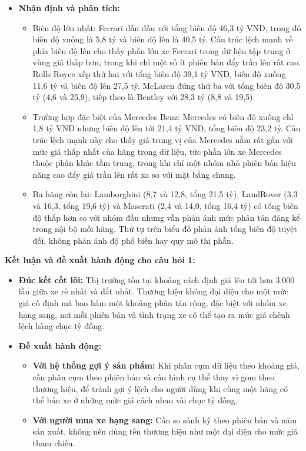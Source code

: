 \begin{itemize}
    \item \textbf{Nhận định và phân tích:}
    \begin{itemize}
        \item Biên độ lớn nhất: Ferrari dẫn đầu với tổng biên độ 46,3 tỷ VND, trong đó biên độ xuống là 5,8 tỷ và biên độ lên là 40,5 tỷ. Cấu trúc lệch mạnh về phía biên độ lên cho thấy phần lớn xe Ferrari trong dữ liệu tập trung ở vùng giá thấp hơn, trong khi chỉ một số ít phiên bản đẩy trần lên rất cao. Rolls Royce xếp thứ hai với tổng biên độ 39,1 tỷ VND, biên độ xuống 11,6 tỷ và biên độ lên 27,5 tỷ. McLaren đứng thứ ba với tổng biên độ 30,5 tỷ (4,6 và 25,9), tiếp theo là Bentley với 28,3 tỷ (8,8 và 19,5).
        \item Trường hợp đặc biệt của Mercedes Benz: Mercedes có biên độ xuống chỉ 1,8 tỷ VND nhưng biên độ lên tới 21,4 tỷ VND, tổng biên độ 23,2 tỷ. Cấu trúc lệch mạnh này cho thấy giá trung vị của Mercedes nằm rất gần với mức giá thấp nhất của hãng trong dữ liệu, tức phần lớn xe Mercedes thuộc phân khúc tầm trung, trong khi chỉ một nhóm nhỏ phiên bản hiệu năng cao đẩy giá trần lên rất xa so với mặt bằng chung.
        \item Ba hãng còn lại: Lamborghini (8,7 và 12,8, tổng 21,5 tỷ), LandRover (3,3 và 16,3, tổng 19,6 tỷ) và Maserati (2,4 và 14,0, tổng 16,4 tỷ) có tổng biên độ thấp hơn so với nhóm đầu nhưng vẫn phản ánh mức phân tán đáng kể trong nội bộ mỗi hãng. Thứ tự trên biểu đồ phản ánh tổng biên độ tuyệt đối, không phản ánh độ phổ biến hay quy mô thị phần.
    \end{itemize}
\end{itemize}

\noindent\textbf{Kết luận và đề xuất hành động cho câu hỏi 1:}
\begin{itemize}
    \item \textbf{Đúc kết cốt lõi:} Thị trường tồn tại khoảng cách định giá lên tới hơn 3.000 lần giữa xe rẻ nhất và đắt nhất. Thương hiệu không đại diện cho một mức giá cố định mà bao hàm một khoảng phân tán rộng, đặc biệt với nhóm xe hạng sang, nơi mỗi phiên bản và tình trạng xe có thể tạo ra mức giá chênh lệch hàng chục tỷ đồng.
    \item \textbf{Đề xuất hành động:}
    \begin{itemize}
        \item \textbf{Với hệ thống gợi ý sản phẩm:} Khi phân cụm dữ liệu theo khoảng giá, cần phân cụm theo phiên bản và cấu hình cụ thể thay vì gom theo thương hiệu, để tránh gợi ý lệch cho người dùng khi cùng một hãng có thể bán xe ở những mức giá cách nhau vài chục tỷ đồng.
        \item \textbf{Với người mua xe hạng sang:} Cần so sánh kỹ theo phiên bản và năm sản xuất, không nên dùng tên thương hiệu như một đại diện cho mức giá tham chiếu.
    \end{itemize}
\end{itemize}


